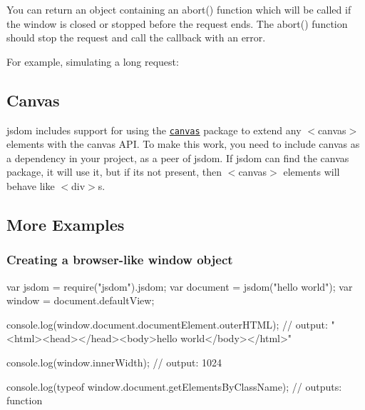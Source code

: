 You can return an object containing an {\ttfamily abort()} function which will be called if the window is closed or stopped before the request ends. The {\ttfamily abort()} function should stop the request and call the callback with an error.

For example, simulating a long request\+:




\subsection*{Canvas}

jsdom includes support for using the \href{https://npmjs.org/package/canvas}{\tt canvas} package to extend any {\ttfamily $<$canvas$>$} elements with the canvas A\+PI. To make this work, you need to include canvas as a dependency in your project, as a peer of jsdom. If jsdom can find the canvas package, it will use it, but if it\textquotesingle{}s not present, then {\ttfamily $<$canvas$>$} elements will behave like {\ttfamily $<$div$>$}s.

\subsection*{More Examples}

\subsubsection*{Creating a browser-\/like window object}


\begin{DoxyCode}
var jsdom = require("jsdom").jsdom;
var document = jsdom("hello world");
var window = document.defaultView;

console.log(window.document.documentElement.outerHTML);
// output: "<html><head></head><body>hello world</body></html>"

console.log(window.innerWidth);
// output: 1024

console.log(typeof window.document.getElementsByClassName);
// outputs: function
\end{DoxyCode}


